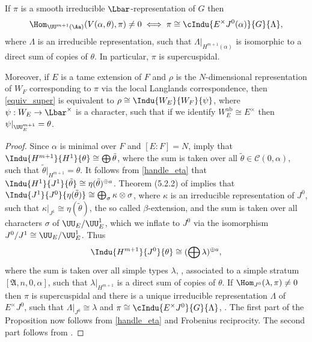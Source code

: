 \begin{prop}\label{types_super} If $\pi$ is a smooth irreducible $\Lbar$-representation of $G$ then
\begin{equation}\label{equiv_super}
\Hom_{\UU^{m+1}(\Aa)}( V(\alpha, \theta), \pi)\neq 0 \iff\pi\cong \cIndu{E^{\times}J^0(\alpha)}{G}{\Lambda},
\end{equation}
where $\Lambda$ is an irreducible representation, such that $\Lambda|_{H^{m+1}(\alpha)}$ is isomorphic to a direct sum of copies of $\theta$. In particular,
$\pi$ is supercuspidal.

Moreover, if $E$ is a tame extension of $F$ and $\rho$ is the $N$-dimensional representation of $W_F$ corresponding to $\pi$ via the
local Langlands correspondence, then \eqref{equiv_super} is equivalent to $\rho\cong \Indu{W_E}{W_F}{\psi}$, where $\psi: W_E \to \Lbar^{\times}$
is a character, such that if we identify $W_E^{\mathrm{ab}}\cong E^{\times}$ then $\psi|_{\UU^{m+1}_E}=\theta$.
\end{prop}

\begin{proof} Since $\alpha$ is minimal over $F$ and $[E:F]=N$, \cite[(3.2.5), (3.3.18)]{BK} imply that $\Indu{H^{m+1}}{H^1}{\theta}\cong \bigoplus \tilde{\theta}$,
where the sum is taken over all $\tilde{\theta}\in \mathcal C(0, \alpha)$, such that \hbox{$\tilde{\theta}|_{H^{m+1}}= \theta$}. It follows from
\eqref{handle_eta} that $\Indu{H^1}{J^1}{\tilde{\theta}}\cong \eta(\tilde{\theta})^{\oplus a}$. Theorem (5.2.2) of \cite{BK} implies that
$\Indu{J^1}{J^0}{\eta(\tilde{\theta})}\cong \bigoplus_{\sigma} \kappa\otimes \sigma$, where $\kappa$ is an irreducible representation of $J^0$, such that $\kappa|_{J^1}\cong \eta(\tilde{\theta})$,
the so called $\beta$-extension, and the sum is taken over all characters $\sigma$ of $\UU_E/\UU^1_E$, which we inflate to $J^0$ via the isomorphism
$J^0/J^1\cong \UU_E/\UU^1_E$. Thus
\begin{equation}
\Indu{H^{m+1}}{J^{0}}{\theta}\cong (\bigoplus \lambda)^{\oplus a},
\end{equation}
where the sum is taken over all simple types $\lambda$, \cite[(5.5.10)]{BK}, associated to a simple stratum $[\mathfrak A, n, 0,\alpha]$, such that
$\lambda |_{H^{m+1}}$ is a direct sum of copies of $\theta$. If $\Hom_{J^0}(\lambda, \pi)\neq 0$ then $\pi$ is supercuspidal and there is a unique
irreducible representation $\Lambda$ of $E^{\times} J^0$, such that $\Lambda|_{J^0}\cong \lambda$ and $\pi\cong \cIndu{E^{\times}J^0}{G}{\Lambda}$, \cite[(6.2.2)]{BK}.
The first part of the Proposition now follows from \eqref{handle_eta} and Frobenius reciprocity. The second part follows from \cite{BH}.
\end{proof}

